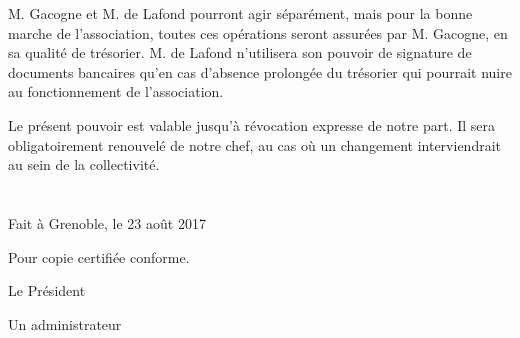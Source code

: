 \documentclass[a4paper,oneside,10pt]{article}
\begin{document}
M. Gacogne et M. de Lafond pourront agir séparément, mais pour la bonne marche de l'association, toutes ces opérations
seront assurées par M. Gacogne, en sa qualité de trésorier. M. de Lafond n'utilisera son pouvoir de signature de
documents bancaires qu'en cas d'absence prolongée du trésorier qui pourrait nuire au fonctionnement de
l'association.

Le présent pouvoir est valable jusqu'à révocation expresse de notre part. Il sera obligatoirement renouvelé
de notre chef, au cas où un changement interviendrait au sein de la collectivité.

\section*{}

Fait à Grenoble, le 23 août 2017

\bigskip

Pour copie certifiée conforme.

Le Président

Un administrateur
\end{document}
